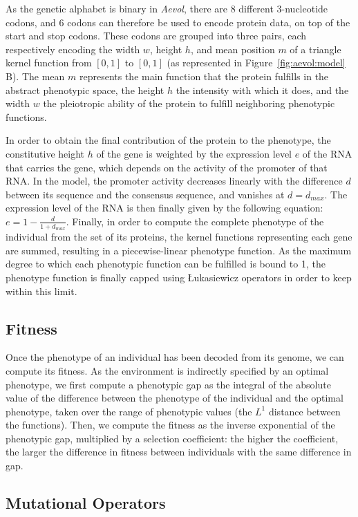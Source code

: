 As the genetic alphabet is binary in \emph{Aevol}, there are 8 different 3-nucleotide codons, and 6 codons can therefore be used to encode protein data, on top of the start and stop codons.
These codons are grouped into three pairs, each respectively encoding the width $w$, height $h$, and mean position $m$ of a triangle kernel function from $[0, 1]$ to $[0, 1]$ (as represented in Figure~\ref{fig:aevol:model} B).
The mean $m$ represents the main function that the protein fulfills in the abstract phenotypic space, the height $h$ the intensity with which it does, and the width $w$ the pleiotropic ability of the protein to fulfill neighboring phenotypic functions.

In order to obtain the final contribution of the protein to the phenotype, the constitutive height $h$ of the gene is weighted by the expression level $e$ of the RNA that carries the gene, which depends on the activity of the promoter of that RNA.
In the model, the promoter activity decreases linearly with the difference $d$ between its sequence and the consensus sequence, and vanishes at $d=d_{max}$.
The expression level of the RNA is then finally given by the following equation: $e = 1 - \frac{d}{1+d_{max}}$.
Finally, in order to compute the complete phenotype of the individual from the set of its proteins, the kernel functions representing each gene are summed, resulting in a piecewise-linear phenotype function.
As the maximum degree to which each phenotypic function can be fulfilled is bound to 1, the phenotype function is finally capped using Łukasiewicz operators in order to keep within this limit.

\subsection{Fitness}

Once the phenotype of an individual has been decoded from its genome, we can compute its fitness.
As the environment is indirectly specified by an optimal phenotype, we first compute a phenotypic gap as the integral of the absolute value of the difference between the phenotype of the individual and the optimal phenotype, taken over the range of phenotypic values (the $L^1$ distance between the functions).
Then, we compute the fitness as the inverse exponential of the phenotypic gap, multiplied by a selection coefficient: the higher the coefficient, the larger the difference in fitness between individuals with the same difference in gap.

\subsection{Mutational Operators}

